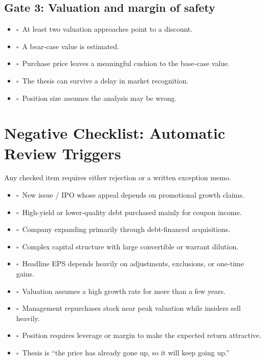 \documentclass[11pt]{article}
\newcommand{\checkbox}{\(\square\)}
\begin{document}
\subsection{Gate 3: Valuation and margin of safety}
\begin{itemize}
\item \checkbox\ At least two valuation approaches point to a discount.
\item \checkbox\ A bear-case value is estimated.
\item \checkbox\ Purchase price leaves a meaningful cushion to the base-case value.
\item \checkbox\ The thesis can survive a delay in market recognition.
\item \checkbox\ Position size assumes the analysis may be wrong.
\end{itemize}

\section{Negative Checklist: Automatic Review Triggers}
Any checked item requires either rejection or a written exception memo.
\begin{itemize}
\item \checkbox\ New issue / IPO whose appeal depends on promotional growth claims.
\item \checkbox\ High-yield or lower-quality debt purchased mainly for coupon income.
\item \checkbox\ Company expanding primarily through debt-financed acquisitions.
\item \checkbox\ Complex capital structure with large convertible or warrant dilution.
\item \checkbox\ Headline EPS depends heavily on adjustments, exclusions, or one-time gains.
\item \checkbox\ Valuation assumes a high growth rate for more than a few years.
\item \checkbox\ Management repurchases stock near peak valuation while insiders sell heavily.
\item \checkbox\ Position requires leverage or margin to make the expected return attractive.
\item \checkbox\ Thesis is ``the price has already gone up, so it will keep going up.''
\end{itemize}
\end{document}
